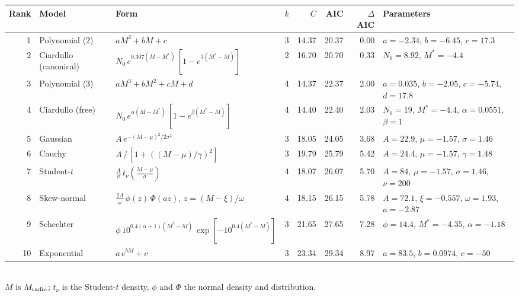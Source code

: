\begin{tabular}{rllrrrrl}
\toprule
Rank & Model & Form & $k$ & $C$ & AIC & $\Delta$AIC & Parameters \\
\midrule
1 & Polynomial (2) & $aM^2+bM+c$ & 3 & 14.37 & 20.37 & 0.00 & $a=-2.34$, $b=-6.45$, $c=17.3$ \\
2 & Ciardullo (canonical) & $N_0\,e^{0.307(M-M^*)}\,[1-e^{3(M^*-M)}]$ & 2 & 16.70 & 20.70 & 0.33 & $N_0=8.92$, $M^*=-4.4$ \\
3 & Polynomial (3) & $aM^3+bM^2+cM+d$ & 4 & 14.37 & 22.37 & 2.00 & $a=0.035$, $b=-2.05$, $c=-5.74$, $d=17.8$ \\
4 & Ciardullo (free) & $N_0\,e^{\alpha(M-M^*)}\,[1-e^{\beta(M^*-M)}]$ & 4 & 14.40 & 22.40 & 2.03 & $N_0=19$, $M^*=-4.4$, $\alpha=0.0551$, $\beta=1$ \\
5 & Gaussian & $A\,e^{-(M-\mu)^2/2\sigma^2}$ & 3 & 18.05 & 24.05 & 3.68 & $A=22.9$, $\mu=-1.57$, $\sigma=1.46$ \\
6 & Cauchy & $A\,/\,[1+((M-\mu)/\gamma)^2]$ & 3 & 19.79 & 25.79 & 5.42 & $A=24.4$, $\mu=-1.57$, $\gamma=1.48$ \\
7 & Student-$t$ & $\frac{A}{\sigma}\,t_\nu\!\left(\frac{M-\mu}{\sigma}\right)$ & 4 & 18.07 & 26.07 & 5.70 & $A=84$, $\mu=-1.57$, $\sigma=1.46$, $\nu=200$ \\
8 & Skew-normal & $\frac{2A}{\omega}\,\phi(z)\,\Phi(az)$, $z=(M-\xi)/\omega$ & 4 & 18.15 & 26.15 & 5.78 & $A=72.1$, $\xi=-0.557$, $\omega=1.93$, $a=-2.87$ \\
9 & Schechter & $\phi\,10^{0.4(\alpha+1)(M^*-M)}\,\exp[-10^{0.4(M^*-M)}]$ & 3 & 21.65 & 27.65 & 7.28 & $\phi=14.4$, $M^*=-4.35$, $\alpha=-1.18$ \\
10 & Exponential & $a\,e^{bM}+c$ & 3 & 23.34 & 29.34 & 8.97 & $a=83.5$, $b=0.0974$, $c=-50$ \\
\bottomrule
\end{tabular}
\\[2pt]
{\footnotesize $M$ is $M_{\rm radio}$; $t_\nu$ is the Student-$t$ density, $\phi$ and $\Phi$ the normal density and distribution.}
